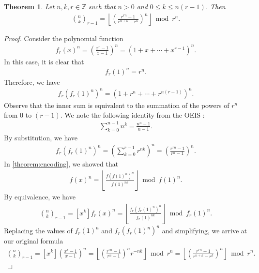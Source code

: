 \documentclass{article}
\theoremstyle{plain}
\newtheorem{theorem}{Theorem}
\theoremstyle{definition}
\newcommand{\floor}[1]{\left\lfloor #1 \right\rfloor}
\begin{document}
\begin{theorem}
\label{proof:multinomialformula}
Let $n,k,r \in \mathbb{Z}$ such that $n > 0$ and $0 \leq k \leq n (r-1)$. Then
\begin{align*}
    \binom{n}{k}_{r-1} = \floor{\left(\frac{r^{rn} - 1}{r^{n+k} - r^k}\right)^n} \bmod r^n .
\end{align*}
\end{theorem}
\begin{proof}
Consider the polynomial function
\begin{align*}
    f_r(x)^n = \left(\frac{x^{r}-1}{x-1}\right)^n = (1 + x + \cdots + x^{r-1})^n .
\end{align*}
In this case, it is clear that
\begin{align*}
    f_r(1)^n = r^n .
\end{align*}
Therefore, we have
\begin{align*}
    f_r(f_r(1)^n)^n = (1 + r^n + \cdots + r^{n (r - 1)})^n .
\end{align*}
Observe that the inner sum is equivalent to the summation of the powers of $r^n$ from $0$ to $(r - 1)$. We note the following identity from the OEIS \cite{A023037}:
\begin{align*}
    \sum_{k=0}^{n-1} n^k = \frac{n^{n} - 1}{n - 1} .
\end{align*}
By substitution, we have
\begin{align*}
    f_r(f_r(1)^n)^n = \left(\sum_{k=0}^{r-1} r^{nk}\right)^n = \left(\frac{r^{rn} - 1}{r^{n} - 1}\right)^n .
\end{align*}
In \cref{theorem:encoding}, we showed that
\begin{align*}
    [x^k] f(x)^{n} = \left\lfloor\frac{f(f(1)^n)^{n}}{f(1)^{n k}}\right\rfloor \bmod{f(1)^{n}} .
\end{align*}
By equivalence, we have
\begin{align*}
    \binom{n}{k}_{r-1} = [x^k] f_r(x)^{n} = \left\lfloor\frac{f_r(f_r(1)^n)^{n}}{f_r(1)^{n k}}\right\rfloor \bmod{f_r(1)^{n}} .
\end{align*}
Replacing the values of $f_r(1)^n$ and $f_r(f_r(1)^n)^n$ and simplifying, we arrive at our original formula
\begin{align*}
    \binom{n}{k}_{r-1} = [x^k] \left(\frac{x^{r}-1}{x-1}\right)^n
    = \left\lfloor \left(\frac{r^{rn} - 1}{r^{n} - 1}\right)^n r^{-n k}\right\rfloor \bmod r^n
    = \left\lfloor \left(\frac{r^{rn} - 1}{r^{n+k} - r^k}\right)^n\right\rfloor \bmod r^n .
\end{align*}


\end{proof}
\end{document}
